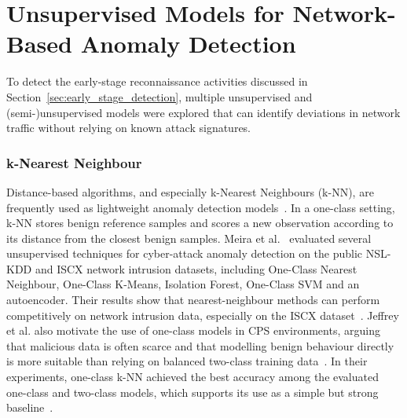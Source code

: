 

\section{Unsupervised Models for Network-Based Anomaly Detection}
\label{sec:literature_models}
To detect the early-stage reconnaissance activities discussed in Section~\ref{sec:early_stage_detection}, multiple unsupervised and (semi-)unsupervised models were explored that can identify deviations in network traffic without relying on known attack signatures. 

\subsubsection{k-Nearest Neighbour}
Distance-based algorithms, and especially k-Nearest Neighbours (k-NN), are frequently used as lightweight anomaly detection models~\cite{meira_performance_2020, jeffrey_hybrid_2024, cai_adam_2023}. In a one-class setting, k-NN stores benign reference samples and scores a new observation according to its distance from the closest benign samples.  Meira et al.~\cite{meira_performance_2020} evaluated several unsupervised techniques for cyber-attack anomaly detection on the public NSL-KDD and ISCX network intrusion datasets, including One-Class Nearest Neighbour, One-Class K-Means, Isolation Forest, One-Class SVM and an autoencoder. Their results show that nearest-neighbour methods can perform competitively on network intrusion data, especially on the ISCX dataset~\cite{meira_performance_2020}. Jeffrey et al. also motivate the use of one-class models in CPS environments, arguing that malicious data is often scarce and that modelling benign behaviour directly is more suitable than relying on balanced two-class training data~\cite{jeffrey_hybrid_2024}. In their experiments, one-class k-NN achieved the best accuracy among the evaluated one-class and two-class models, which supports its use as a simple but strong baseline~\cite{jeffrey_hybrid_2024}.

